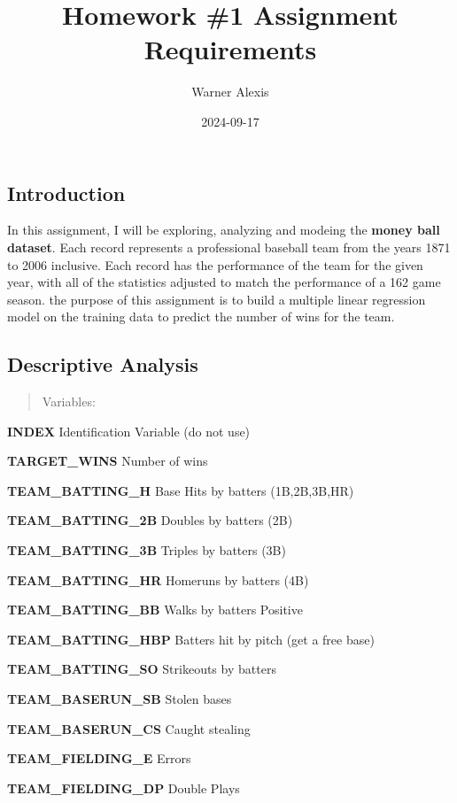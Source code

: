 \documentclass[
]{article}
\title{Homework \#1 Assignment Requirements}
\author{Warner Alexis}
\date{2024-09-17}
\begin{document}
\maketitle

\hypertarget{introduction}{%
\subsection{Introduction}\label{introduction}}

In this assignment, I will be exploring, analyzing and modeing the
\textbf{money ball dataset}. Each record represents a professional
baseball team from the years 1871 to 2006 inclusive. Each record has the
performance of the team for the given year, with all of the statistics
adjusted to match the performance of a 162 game season. the purpose of
this assignment is to build a multiple linear regression model on the
training data to predict the number of wins for the team.

\hypertarget{descriptive-analysis}{%
\subsection{Descriptive Analysis}\label{descriptive-analysis}}

\begin{quote}
Variables:
\end{quote}

\textbf{INDEX} Identification Variable (do not use)

\textbf{TARGET\_WINS} Number of wins

\textbf{TEAM\_BATTING\_H} Base Hits by batters (1B,2B,3B,HR)

\textbf{TEAM\_BATTING\_2B} Doubles by batters (2B)

\textbf{TEAM\_BATTING\_3B} Triples by batters (3B)

\textbf{TEAM\_BATTING\_HR} Homeruns by batters (4B)

\textbf{TEAM\_BATTING\_BB} Walks by batters Positive

\textbf{TEAM\_BATTING\_HBP} Batters hit by pitch (get a free base)

\textbf{TEAM\_BATTING\_SO} Strikeouts by batters

\textbf{TEAM\_BASERUN\_SB} Stolen bases

\textbf{TEAM\_BASERUN\_CS} Caught stealing

\textbf{TEAM\_FIELDING\_E} Errors

\textbf{TEAM\_FIELDING\_DP} Double Plays
\end{document}
